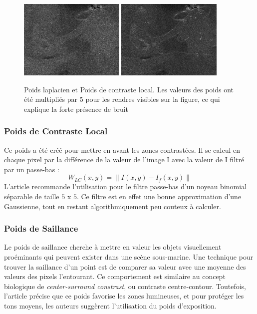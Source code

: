 \documentclass[twoside]{article}
\begin{document}
\begin{figure}[]
  \centering
  \includegraphics[width=0.45\textwidth]{Support/laplacian.png}
  \includegraphics[width=0.45\textwidth]{Support/lc.png}

  \caption{Poids laplacien et Poids de contraste local. Les valeurs des poids ont été multipliés par 5 pour les rendres visibles sur la figure, ce qui explique la forte présence de bruit}
\end{figure}

\subsubsection{Poids de Contraste Local}

Ce poids a été créé pour mettre en avant les zones contrastées. Il se calcul en chaque pixel par la différence de la valeur de l'image I avec la valeur de I filtré par un passe-bas : $$ W_{LC}(x,y) = \|I(x,y) - I_{f}(x,y)\| $$
L'article recommande l'utilisation pour le filtre passe-bas d'un noyeau binomial séparable de taille $5$ x $5$. Ce filtre est en effet une bonne approximation d'une Gaussienne, tout en restant algorithmiquement peu couteux à calculer.

\subsubsection{Poids de Saillance}
Le poids de saillance cherche à mettre en valeur les objets visuellement proéminants qui peuvent exister dans une scène sous-marine. Une technique pour trouver la saillance d'un point est de comparer sa valeur avec une moyenne des valeurs des pixels l'entourant. Ce comportement est similaire au concept biologique de \emph{center-surround constrast}, ou contraste centre-contour. Toutefois, l'article précise que ce poids favorise les zones lumineuses, et pour protéger les tons moyens, les auteurs suggèrent l'utilisation du poids d'exposition.
\end{document}

